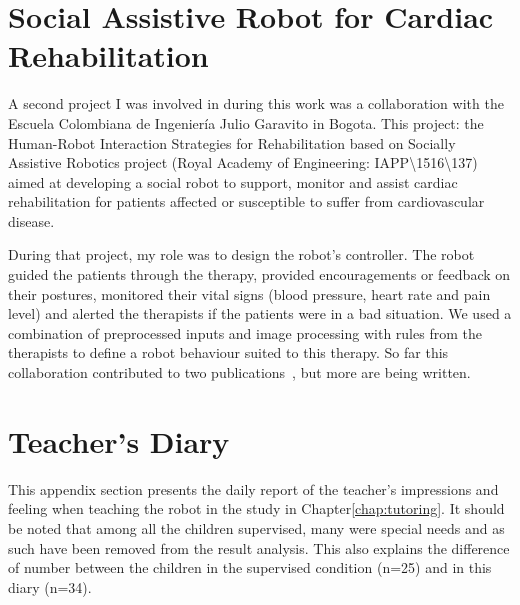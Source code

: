 \cleartooddpage
\chapter{Social Assistive Robot for Cardiac Rehabilitation} \label{app:Colombia}

A  second project I was involved in during this work was a collaboration with the Escuela Colombiana de Ingeniería Julio Garavito in Bogota. This project:  the Human-Robot Interaction Strategies for Rehabilitation based on Socially Assistive Robotics project (Royal Academy of Engineering: IAPP\textbackslash1516\textbackslash137) aimed at developing a social robot to support, monitor and assist cardiac rehabilitation for patients affected or susceptible to suffer from cardiovascular disease.

During that project, my role was to design the robot's controller. The robot guided the patients through the therapy, provided encouragements or feedback on their postures, monitored their vital signs (blood pressure, heart rate and pain level) and alerted the therapists if the patients were in a bad situation. We used a combination of preprocessed inputs and image processing with rules from the therapists to define a robot behaviour suited to this therapy. So far this collaboration contributed to two publications~\citep{lara2017human,casas2018social}, but more are being written.

\cleartooddpage
\chapter{Teacher's Diary} \label{app:diary}
This appendix section presents the daily report of the teacher's impressions and feeling when teaching the robot in the study in Chapter\ref{chap:tutoring}. It should be noted that among all the children supervised, many were special needs and as such have been removed from the result analysis. This also explains the difference of number between the children in the supervised condition (n=25) and in this diary (n=34).

